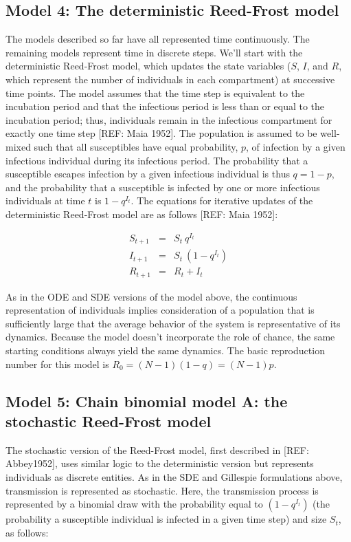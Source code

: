 \documentclass[margin,line,11pt]{article}
\begin{document}
\subsection{Model 4: The deterministic Reed-Frost model}

The models described so far have all represented time continuously. The remaining models represent time in discrete steps. We'll start with the deterministic Reed-Frost model, which updates the state variables ($S$, $I$, and $R$, which represent the number of individuals in each compartment) at successive time points. The model assumes that the time step is equivalent to the incubation period and that the infectious period is less than or equal to the incubation period; thus, individuals remain in the infectious compartment for exactly one time step [REF: Maia 1952]. The population is assumed to be well-mixed such that all susceptibles have equal probability, $p$, of infection by a given infectious individual during its infectious period. The probability that a susceptible escapes infection by a given infectious individual is thus $q = 1-p$, and the probability that a susceptible is infected by one or more infectious individuals at time $t$ is $1-q^{I_t}$. The equations for iterative updates of the deterministic Reed-Frost model are as follows [REF: Maia 1952]:

\begin{eqnarray*}
S_{t+1} &=& S_t\ q^{I_t} \\
I_{t+1} &=& S_t\ (1-q^{I_t}) \\
R_{t+1} &=& R_t + I_t
\end{eqnarray*}

\noindent As in the ODE and SDE versions of the model above, the continuous representation of individuals implies consideration of a population that is sufficiently large that the average behavior of the system is representative of its dynamics. Because the model doesn't incorporate the role of chance, the same starting conditions always yield the same dynamics. The basic reproduction number for this model is $R_0 = (N-1)(1-q) = (N-1)p$. 

\subsection{Model 5: Chain binomial model A: the stochastic Reed-Frost model}

The stochastic version of the Reed-Frost model, first described in [REF: Abbey1952], uses similar logic to the deterministic version but represents individuals as discrete entities. As in the SDE and Gillespie formulations above, transmission is represented as stochastic. Here, the transmission process is represented by a binomial draw with the probability equal to $(1-q^{I_t})$ (the probability a susceptible individual is infected in a given time step) and size $S_t$, as follows:
\end{document}
